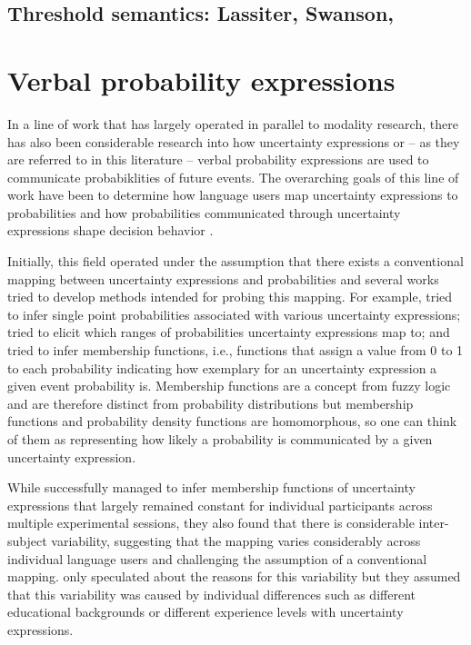 \subsection{Threshold semantics: Lassiter, Swanson, }


\section{Verbal probability expressions}

In a line of work that has largely operated in parallel to modality research, there has also been considerable research 
into how uncertainty expressions or -- as they are referred to in this literature -- verbal probability expressions are used
to communicate probabiklities of future events. The overarching goals of this line of work have been to determine how
language users map uncertainty expressions to probabilities and how probabilities communicated through uncertainty expressions
shape decision behavior \cite{BudescuWallsten1995}. 

Initially, this field operated under the assumption that there exists a conventional mapping between uncertainty expressions
and probabilities and several works tried to develop methods intended for probing this mapping. For example, \cite{BethMarom1982} 
tried to infer single point probabilities associated with various uncertainty expressions; \cite{Hamm1991} tried to elicit which ranges of
probabilities uncertainty expressions map to; and \cite{WallstenBudescuRapoportetal.1986} tried to infer membership functions, i.e., 
functions that assign a value from 0 to 1 to each probability indicating how exemplary for an uncertainty expression a given
event probability is. Membership functions are a concept from fuzzy logic and are therefore distinct from probability distributions but 
 membership functions and probability density functions are homomorphous, so one can think of them as representing how likely a 
probability is communicated by a given uncertainty expression.

While \cite{WallstenBudescuRapoportetal1986} successfully managed to infer membership functions of uncertainty expressions
that largely remained constant for individual participants across multiple experimental sessions, they also found that there is considerable
inter-subject variability, suggesting that the mapping varies considerably across individual language users and challenging
the assumption of a conventional mapping. \cite{WallstenBudescuRapoportetal1986} only speculated about the reasons 
for this variability but they assumed that this variability was caused by individual differences such as different educational backgrounds
or different experience levels with uncertainty expressions.

